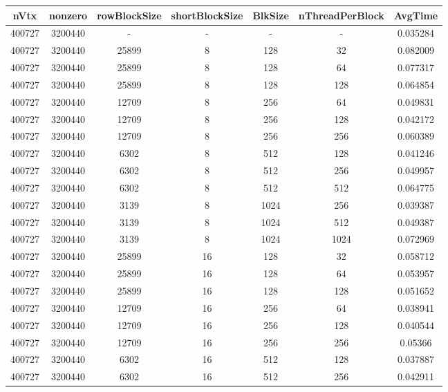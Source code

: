 \documentclass[9pt]{article}
\begin{document}
\SetBgPosition{0.25cm,-5.0cm}
\begin{tabular}{|c|c|c|c|c|c|c| }  
\hline
nVtx  & nonzero  & rowBlockSize  & shortBlockSize  & BlkSize  & nThreadPerBlock  & AvgTime \\
\hline
400727  & 3200440  &  -  & -  & -  & -  &0.035284 \\
\hline
400727  & 3200440  & 25899  & 8  & 128  & 32  & 0.082009 \\
\hline
400727  & 3200440  & 25899  & 8  & 128  & 64  & 0.077317 \\
\hline
400727  & 3200440  & 25899  & 8  & 128  & 128  & 0.064854 \\
\hline
400727  & 3200440  & 12709  & 8  & 256  & 64  & 0.049831 \\
\hline
400727  & 3200440  & 12709  & 8  & 256  & 128  & 0.042172 \\
\hline
400727  & 3200440  & 12709  & 8  & 256  & 256  & 0.060389 \\
\hline
400727  & 3200440  & 6302  & 8  & 512  & 128  & 0.041246 \\
\hline
400727  & 3200440  & 6302  & 8  & 512  & 256  & 0.049957 \\
\hline
400727  & 3200440  & 6302  & 8  & 512  & 512  & 0.064775 \\
\hline
400727  & 3200440  & 3139  & 8  & 1024  & 256  & 0.039387 \\
\hline
400727  & 3200440  & 3139  & 8  & 1024  & 512  & 0.049387 \\
\hline
400727  & 3200440  & 3139  & 8  & 1024  & 1024  & 0.072969 \\
\hline
400727  & 3200440  & 25899  & 16  & 128  & 32  & 0.058712 \\
\hline
400727  & 3200440  & 25899  & 16  & 128  & 64  & 0.053957 \\
\hline
400727  & 3200440  & 25899  & 16  & 128  & 128  & 0.051652 \\
\hline
400727  & 3200440  & 12709  & 16  & 256  & 64  & 0.038941 \\
\hline
400727  & 3200440  & 12709  & 16  & 256  & 128  & 0.040544 \\
\hline
400727  & 3200440  & 12709  & 16  & 256  & 256  & 0.05366 \\
\hline
400727  & 3200440  & 6302  & 16  & 512  & 128  & 0.037887 \\
\hline
400727  & 3200440  & 6302  & 16  & 512  & 256  & 0.042911 \\

\end{tabular}
\end{document}
